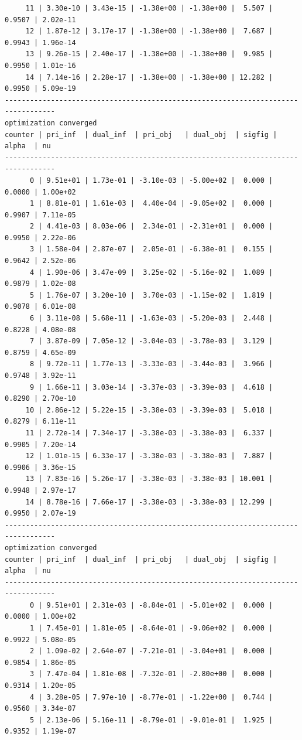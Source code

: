 \documentclass[
]{book}
\begin{document}
\begin{verbatim}
     11 | 3.30e-10 | 3.43e-15 | -1.38e+00 | -1.38e+00 |  5.507 | 0.9507 | 2.02e-11
     12 | 1.87e-12 | 3.17e-17 | -1.38e+00 | -1.38e+00 |  7.687 | 0.9943 | 1.96e-14
     13 | 9.26e-15 | 2.40e-17 | -1.38e+00 | -1.38e+00 |  9.985 | 0.9950 | 1.01e-16
     14 | 7.14e-16 | 2.28e-17 | -1.38e+00 | -1.38e+00 | 12.282 | 0.9950 | 5.09e-19
----------------------------------------------------------------------------------
optimization converged
counter | pri_inf  | dual_inf  | pri_obj   | dual_obj  | sigfig | alpha  | nu 
----------------------------------------------------------------------------------
      0 | 9.51e+01 | 1.73e-01 | -3.10e-03 | -5.00e+02 |  0.000 | 0.0000 | 1.00e+02
      1 | 8.81e-01 | 1.61e-03 |  4.40e-04 | -9.05e+02 |  0.000 | 0.9907 | 7.11e-05
      2 | 4.41e-03 | 8.03e-06 |  2.34e-01 | -2.31e+01 |  0.000 | 0.9950 | 2.22e-06
      3 | 1.58e-04 | 2.87e-07 |  2.05e-01 | -6.38e-01 |  0.155 | 0.9642 | 2.52e-06
      4 | 1.90e-06 | 3.47e-09 |  3.25e-02 | -5.16e-02 |  1.089 | 0.9879 | 1.02e-08
      5 | 1.76e-07 | 3.20e-10 |  3.70e-03 | -1.15e-02 |  1.819 | 0.9078 | 6.01e-08
      6 | 3.11e-08 | 5.68e-11 | -1.63e-03 | -5.20e-03 |  2.448 | 0.8228 | 4.08e-08
      7 | 3.87e-09 | 7.05e-12 | -3.04e-03 | -3.78e-03 |  3.129 | 0.8759 | 4.65e-09
      8 | 9.72e-11 | 1.77e-13 | -3.33e-03 | -3.44e-03 |  3.966 | 0.9748 | 3.92e-11
      9 | 1.66e-11 | 3.03e-14 | -3.37e-03 | -3.39e-03 |  4.618 | 0.8290 | 2.70e-10
     10 | 2.86e-12 | 5.22e-15 | -3.38e-03 | -3.39e-03 |  5.018 | 0.8279 | 6.11e-11
     11 | 2.72e-14 | 7.34e-17 | -3.38e-03 | -3.38e-03 |  6.337 | 0.9905 | 7.20e-14
     12 | 1.01e-15 | 6.33e-17 | -3.38e-03 | -3.38e-03 |  7.887 | 0.9906 | 3.36e-15
     13 | 7.83e-16 | 5.26e-17 | -3.38e-03 | -3.38e-03 | 10.001 | 0.9948 | 2.97e-17
     14 | 8.78e-16 | 7.66e-17 | -3.38e-03 | -3.38e-03 | 12.299 | 0.9950 | 2.07e-19
----------------------------------------------------------------------------------
optimization converged
counter | pri_inf  | dual_inf  | pri_obj   | dual_obj  | sigfig | alpha  | nu 
----------------------------------------------------------------------------------
      0 | 9.51e+01 | 2.31e-03 | -8.84e-01 | -5.01e+02 |  0.000 | 0.0000 | 1.00e+02
      1 | 7.45e-01 | 1.81e-05 | -8.64e-01 | -9.06e+02 |  0.000 | 0.9922 | 5.08e-05
      2 | 1.09e-02 | 2.64e-07 | -7.21e-01 | -3.04e+01 |  0.000 | 0.9854 | 1.86e-05
      3 | 7.47e-04 | 1.81e-08 | -7.32e-01 | -2.80e+00 |  0.000 | 0.9314 | 1.20e-05
      4 | 3.28e-05 | 7.97e-10 | -8.77e-01 | -1.22e+00 |  0.744 | 0.9560 | 3.34e-07
      5 | 2.13e-06 | 5.16e-11 | -8.79e-01 | -9.01e-01 |  1.925 | 0.9352 | 1.19e-07

\end{verbatim}
\end{document}
